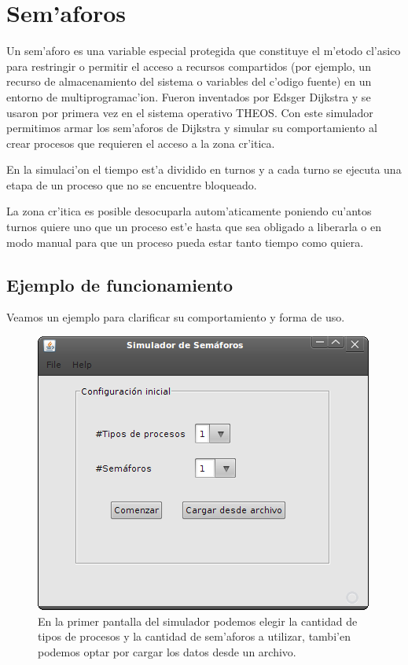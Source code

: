 \section{Sem'aforos}
Un sem'aforo es una variable especial protegida que constituye el m'etodo
cl'asico para restringir o permitir el acceso a recursos compartidos (por
ejemplo, un recurso de almacenamiento del sistema o variables del c'odigo
fuente) en un entorno de multiprogramac'ion. Fueron inventados por Edsger
Dijkstra y se usaron por primera vez en el sistema operativo THEOS.
Con este simulador permitimos armar los sem'aforos de Dijkstra y simular su
comportamiento al crear procesos que requieren el acceso a la zona cr'itica.

En la simulaci'on el tiempo est'a dividido en turnos y a cada turno se ejecuta
una etapa de un proceso que no se encuentre bloqueado. 

La zona cr'itica es posible desocuparla autom'aticamente poniendo cu'antos
turnos quiere uno que un proceso est'e hasta que sea obligado a liberarla o en
modo manual para que un proceso pueda estar tanto tiempo como quiera.

\subsection{Ejemplo de funcionamiento}
Veamos un ejemplo para clarificar su comportamiento y forma de uso.

\begin{figure}[h!]
\centering
 \includegraphics[scale=0.33,keepaspectratio=true]{./imagenes/semaforo/semaforos1.png}
 \caption{En la primer pantalla del simulador podemos elegir la cantidad de tipos de procesos y la cantidad de sem'aforos a utilizar, tambi'en podemos optar por cargar los datos desde un archivo.}
\end{figure}
\newpage

